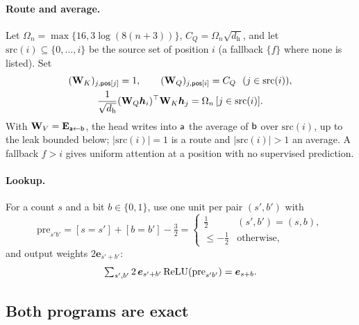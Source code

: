 \paragraph{Route and average.} Let $\Omega_n=\max\{16,3\log(8(n+3))\}$, $C_Q=\Omega_n\sqrt{d_{\mathrm h}}$, and let $\mathrm{src}(i)\subseteq\{0,\ldots,i\}$ be the source set
of position $i$ (a fallback $\{f\}$ where none is listed). Set
\begin{equation}
 \begin{gathered}
 (\mathbf W_K)_{j,\reg{pos}[j]}=1,\qquad (\mathbf W_Q)_{j,\reg{pos}[i]}=C_Q\ \ (j\in\mathrm{src}(i)),\\
 \tfrac{1}{\sqrt{d_{\mathrm h}}}(\mathbf W_Q\bm h_i)^\top \mathbf W_K\bm h_j=\Omega_n\,[j\in\mathrm{src}(i)] .
 \end{gathered}
 \label{eq:route}
\end{equation}
With $\mathbf W_V=\mathbf E_{\mathsf{a}\leftarrow\mathsf{b}}$, the head writes into $\mathsf{a}$ the average of $\mathsf{b}$ over $\mathrm{src}(i)$, up to the leak bounded below; $|\mathrm{src}(i)|=1$ is a
route and $|\mathrm{src}(i)|>1$ an average. A fallback $f>i$ gives uniform attention at a position with no supervised prediction.

\paragraph{Lookup.} For a count $s$ and a bit $b\in\{0,1\}$, use one unit per pair $(s',b')$ with
\[
 \mathrm{pre}_{s'b'}=[s=s']+[b=b']-\tfrac{3}{2}=\begin{cases}\tfrac{1}{2}&(s',b')=(s,b),\\\le-\tfrac{1}{2}&\text{otherwise},\end{cases}
\]
and output weights $2\bm e_{s'+b'}$:
\begin{equation}
 \textstyle\sum_{s',b'}2\,\bm e_{s'+b'}\operatorname{ReLU}(\mathrm{pre}_{s'b'})=\bm e_{s+b}.
 \label{eq:lookup}
\end{equation}

\subsection{Both programs are exact}
\label{app:exact}

